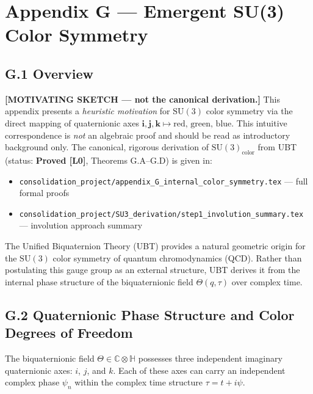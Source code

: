 
\appendix
\section*{Appendix G — Emergent SU(3) Color Symmetry}

\subsection*{G.1 Overview}

\noindent\textbf{[MOTIVATING SKETCH — not the canonical derivation.]}
This appendix presents a \emph{heuristic motivation} for $\mathrm{SU}(3)$ color symmetry via the direct mapping of quaternionic axes $\mathbf{i},\mathbf{j},\mathbf{k} \mapsto \text{red, green, blue}$.
This intuitive correspondence is \emph{not} an algebraic proof and should be read as introductory background only.
The canonical, rigorous derivation of $\mathrm{SU}(3)_{\mathrm{color}}$ from UBT (status: \textbf{Proved [L0]}, Theorems G.A–G.D) is given in:
\begin{itemize}
  \item \texttt{consolidation\_project/appendix\_G\_internal\_color\_symmetry.tex} — full formal proofs
  \item \texttt{consolidation\_project/SU3\_derivation/step1\_involution\_summary.tex} — involution approach summary
\end{itemize}

The Unified Biquaternion Theory (UBT) provides a natural geometric origin for the $\mathrm{SU}(3)$ color symmetry of quantum chromodynamics (QCD). Rather than postulating this gauge group as an external structure, UBT derives it from the internal phase structure of the biquaternionic field $\Theta(q,\tau)$ over complex time.

\subsection*{G.2 Quaternionic Phase Structure and Color Degrees of Freedom}

The biquaternionic field $\Theta \in \mathbb{C}\otimes\mathbb{H}$ possesses three independent imaginary quaternionic axes: $i$, $j$, and $k$. Each of these axes can carry an independent complex phase $\psi_n$ within the complex time structure $\tau = t + i\psi$.

